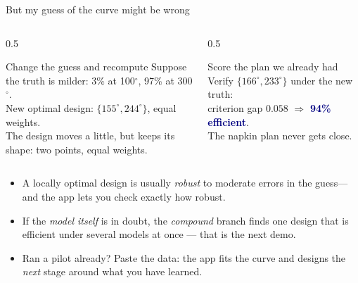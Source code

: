 \documentclass[aspectratio=169,10pt]{beamer}
\newcommand{\key}[1]{\textcolor{navy}{\textbf{#1}}}
\begin{document}
\begin{frame}{But my guess of the curve might be wrong}
  \small
  \begin{columns}[T]
    \begin{column}{0.5\textwidth}
      \begin{block}{Change the guess and recompute}
        Suppose the truth is milder: 3\% at 100$^\circ$, 97\% at 300$^\circ$.\\[3pt]
        New optimal design: $\{155^\circ, 244^\circ\}$, equal weights.\\
        The design moves a little, but keeps its shape: two points, equal weights.
      \end{block}
    \end{column}
    \begin{column}{0.5\textwidth}
      \begin{alertblock}{Score the plan we already had}
        Verify $\{166^\circ, 233^\circ\}$ under the new truth:\\
        criterion gap $0.058$ $\Rightarrow$ \key{94\% efficient}.\\[3pt]
        The napkin plan never gets close.
      \end{alertblock}
    \end{column}
  \end{columns}
  \vspace{0.4em}
  \begin{itemize}
    \item A locally optimal design is usually \emph{robust} to moderate errors in the guess---and the app lets you check exactly how robust.
    \item If the \emph{model itself} is in doubt, the \emph{compound} branch finds one design that is efficient under several models at once
          --- that is the next demo.
    \item Ran a pilot already? Paste the data: the app fits the curve and designs the \emph{next} stage around what you have learned.
  \end{itemize}
\end{frame}
\end{document}
